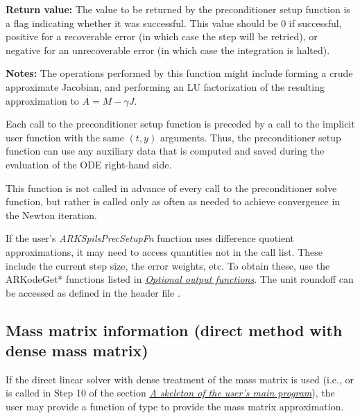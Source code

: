 \documentclass[letterpaper,10pt,english]{sphinxmanual}
\begin{document}
\begin{fulllineitems}
\begin{description}
\begin{itemize}
\end{itemize}

\end{description}

\textbf{Return value:}
The value to be returned by the preconditioner setup
function is a flag indicating whether it was successful. This value
should be 0 if successful, positive for a recoverable error (in
which case the step will be retried), or negative for an
unrecoverable error (in which case the integration is halted).

\textbf{Notes:}  The operations performed by this function might include
forming a crude approximate Jacobian, and performing an LU
factorization of the resulting approximation to $A = M -
\gamma J$.

Each call to the preconditioner setup function is preceded by a
call to the implicit {\hyperref[c_interface/User_supplied:ARKRhsFn]{}} user function with the same
$(t,y)$ arguments.  Thus, the preconditioner setup function can
use any auxiliary data that is computed and saved during the
evaluation of the ODE right-hand side.

This function is not called in advance of every call to the
preconditioner solve function, but rather is called only as often
as needed to achieve convergence in the Newton iteration.

If the user's \emph{ARKSpilsPrecSetupFn} function uses difference
quotient approximations, it may need to access quantities not in
the call list. These include the current step size, the error
weights, etc. To obtain these, use the ARKodeGet* functions
listed in {\hyperref[c_interface/User_callable:cinterface-optionaloutputs]{\emph{Optional output functions}}}. The unit roundoff
can be accessed as  defined in the header file
.

\end{fulllineitems}



\subsection{Mass matrix information (direct method with dense mass matrix)}
\label{c_interface/User_supplied:cinterface-densemassfn}\label{c_interface/User_supplied:mass-matrix-information-direct-method-with-dense-mass-matrix}
If the direct linear solver with dense treatment of the mass matrix is
used (i.e., {\hyperref[c_interface/User_callable:ARKMassDense]{}} or {\hyperref[c_interface/User_callable:ARKMassLapackDense]{}}
is called in Step 10 of the section {\hyperref[c_interface/Skeleton:cinterface-skeleton]{\emph{A skeleton of the user's main program}}}), the
user may provide a function of type {\hyperref[c_interface/User_supplied:ARKDlsDenseMassFn]{}} to
provide the mass matrix approximation.
\end{document}
